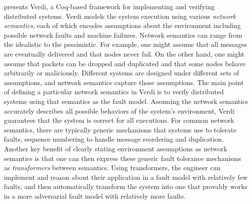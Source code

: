  presents Verdi, a Coq-based framework for implementing and
verifying distributed systems.  Verdi models the system execution
using various \emph{network semantics}, each of which encodes
assumptions about the environment including possible network faults
and machine failures.  Network semantics can range from the idealistic
to the pessimistic. For example, one might assume that all messages
are eventually delivered and that nodes never fail. On the other hand,
one might assume that packets can be dropped and duplicated and that
some nodes behave arbitrarily or maliciously. Different systems are
designed under different sets of assumptions, and network semantics
capture those assumptions.
The main point of defining a particular network semantics in Verdi is to verify
distributed systems using that semantics as the fault model.
Assuming the network semantics
accurately describes all possible behaviors of the system's
environment, Verdi guarantees that the system is correct for all executions.
For common network semantics, there are typically generic mechanisms
that systems use to tolerate faults, \eg sequence numbering to handle
message reordering and duplication. Another key benefit of clearly
stating environment assumptions as network semantics is that one
can then express these generic fault tolerance mechanisms as \emph{transformers}
between semantics.
Using transformers, the engineer can implement and reason about their
application in a fault model
with relatively few faults, and then automatically transform the system
into one that provably works in a more adversarial fault model with
relatively more faults. 




